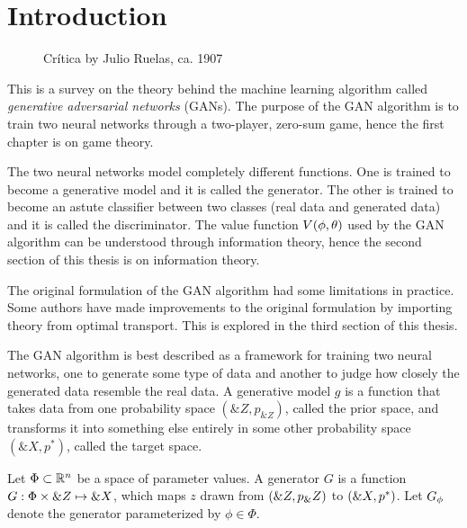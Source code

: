 \section{Introduction}%
\setcounter{page}{1}

\vspace{1cm}

\begin{figure}[h]
  \label{fig:paradise}
  \centering
  \caption{Crítica by Julio Ruelas, ca. 1907}
\end{figure}

\vspace{1cm}

\noindent This is a survey on the theory behind the machine learning
algorithm called \textit{generative adversarial networks} (GANs).  The
purpose of the GAN algorithm is to train two neural networks through a
two-player, zero-sum game, hence the first chapter is on game theory.

The two neural networks model completely different functions.  One is
trained to become a generative model and it is called the generator.
The other is trained to become an astute classifier between two
classes (real data and generated data) and it is called the
discriminator.  The value function $V(\phi, \theta)$ used by the GAN algorithm can
be understood through information theory, hence the second section of
this thesis is on information theory.

The original formulation of the GAN algorithm had some limitations in
practice.  Some authors have made improvements to the original
formulation by importing theory from optimal transport.  This is
explored in the third section of this thesis.

The GAN algorithm is best described as a framework for training two
neural networks, one to generate some type of data and another to
judge how closely the generated data resemble the real data.  A
generative model $g$ is a function that takes data from one
probability space $(\&Z, p_{\&Z})$, called the prior space, and
transforms it into something else entirely in some other probability
space $(\&X, p^*)$, called the target space.

\begin{definition}%
  \label{def:generator}
  Let $\Phi \subset \mathbb{R}^n$ be a space of parameter values. A
  \textnormal{\sffamily generator} $G$ is a function
  $G: \Phi \times \&Z \mapsto \&X$, which maps $z$ drawn from
  $(\&Z, p_\&Z)$ to $(\&X, p^*)$.  Let $G_\phi$ denote the generator
  parameterized by $\phi \in \Phi$.
\end{definition}

